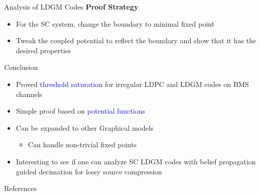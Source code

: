 \documentclass{beamer}
\newlength{\threecolwid}
\begin{document}
\begin{columns}[t]
\begin{column}{\threecolwid}
\begin{block}{Analysis of LDGM Codes}
      \vspace{1.25cm}
      \textcolor{jblue}{\bf Proof Strategy}
      \begin{itemize}
      \item\vspace{0.75cm} For the SC system, change the boundary to \alert{minimal fixed point}
      \item\vspace{0.75cm} Tweak the coupled potential to reflect the boundary and show that it has the \alert{desired} properties
      \end{itemize}
    \end{block}


    \vspace{2.5cm}
    \begin{alertblock}{Conclusion}
      \begin{itemize}
      \item Proved \textcolor{blue}{threshold saturation} for irregular LDPC and LDGM codes on BMS channels
      \item\vspace{0.75cm} Simple proof based on \textcolor{blue}{potential functions}
      \item\vspace{0.75cm} Can be expanded to other Graphical models
        \begin{itemize}
        \item\vspace{0.75cm} Can handle \alert{non-trivial fixed points}
        \end{itemize}
      \item\vspace{0.75cm} Interesting to see if one can analyze SC LDGM codes with belief propagation guided decimation for lossy source compression 
      \end{itemize}
    \end{alertblock}

    \vspace{2.5cm}
    \begin{block}{References}


\end{block}
\end{column}
\end{columns}
\end{document}
